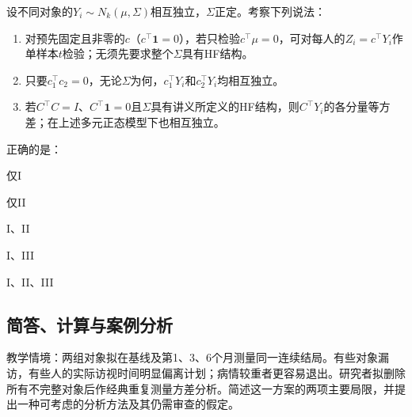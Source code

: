 \par\noindent\begin{minipage}{\linewidth}
设不同对象的$Y_i\sim N_k(\mu,\Sigma)$相互独立，$\Sigma$正定。考察下列说法：
\begin{enumerate}
\item[I.] 对预先固定且非零的$c$（$c^\top\mathbf1=0$），若只检验$c^\top\mu=0$，可对每人的$Z_i=c^\top Y_i$作单样本$t$检验；无须先要求整个$\Sigma$具有HF结构。
\item[II.] 只要$c_1^\top c_2=0$，无论$\Sigma$为何，$c_1^\top Y_i$和$c_2^\top Y_i$均相互独立。
\item[III.] 若$C^\top C=I$、$C^\top\mathbf1=0$且$\Sigma$具有讲义所定义的HF结构，则$C^\top Y_i$的各分量等方差；在上述多元正态模型下也相互独立。
\end{enumerate}
正确的是：
\begin{choices}
\item 仅I
\item 仅II
\item I、II
\item I、III
\item I、II、III
\end{choices}
\end{minipage}\par\medskip

\subsection{简答、计算与案例分析}

教学情境：两组对象拟在基线及第1、3、6个月测量同一连续结局。有些对象漏访，有些人的实际访视时间明显偏离计划；病情较重者更容易退出。研究者拟删除所有不完整对象后作经典重复测量方差分析。简述这一方案的两项主要局限，并提出一种可考虑的分析方法及其仍需审查的假定。

